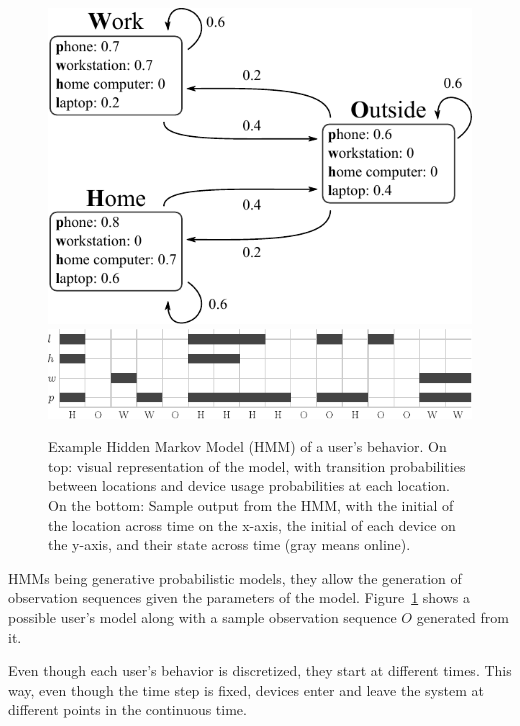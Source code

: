 \begin{figure}[t]
\centering
\vspace{-1em}
\footnotesize
\centering

\includegraphics[width=0.65\columnwidth]{figures/hmm.pdf}
\vspace{2ex}
\includegraphics[width=0.9\columnwidth]{figures/sample_usage.pdf}

\caption{\label{fig:hmm} Example Hidden Markov Model (HMM) of a user's behavior. On top: visual representation of the model, with transition probabilities between locations and device usage probabilities at each location. On the bottom: Sample output from the HMM, with the initial of the location across time on the x-axis, the initial of each device on the y-axis, and their state across time (gray means online).}
\end{figure}

HMMs being generative probabilistic models, they allow the generation of observation sequences given the parameters of the model.
Figure~\ref{fig:hmm} shows a possible user's model along with a sample observation sequence $O$ generated from it.

Even though each user's behavior is discretized, they start at different times. 
This way, even though the time step \tuser is fixed, devices enter and leave the system at different points in the continuous time.


